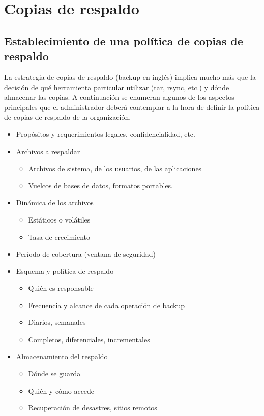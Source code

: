 \section{Copias de respaldo}
\subsection{Establecimiento de una política de copias de respaldo}
La estrategia de copias de respaldo (backup en inglés)  implica mucho más que la decisión 
de qué herramienta particular utilizar (tar, rsync, etc.)  y dónde almacenar las copias.  A continuación 
se enumeran algunos de los aspectos principales que el administrador deberá contemplar a la hora de definir 
la política de copias de respaldo de la organización.

\begin{itemize}
	\item Propósitos y requerimientos legales, confidencialidad, etc.
	\item Archivos a respaldar 
	\begin{itemize}
		\item Archivos de sistema, de los usuarios, de las aplicaciones
		\item Vuelcos de bases de datos, formatos portables.
	\end{itemize}	
	\item Dinámica de los archivos
	\begin{itemize}
		\item Estáticos o volátiles 
		\item Tasa de crecimiento 
	\end{itemize}
	\item Período de cobertura (ventana de seguridad)
	\item Esquema y política de respaldo 
	\begin{itemize}
		\item Quién es responsable
		\item Frecuencia y alcance de cada operación de backup
		\item Diarios, semanales
		\item Completos, diferenciales, incrementales
	\end{itemize}
	\item Almacenamiento del respaldo 
	\begin{itemize}
		\item Dónde se guarda
		\item Quién y cómo accede
		\item Recuperación de desastres, sitios remotos

\end{itemize}
\end{itemize}
